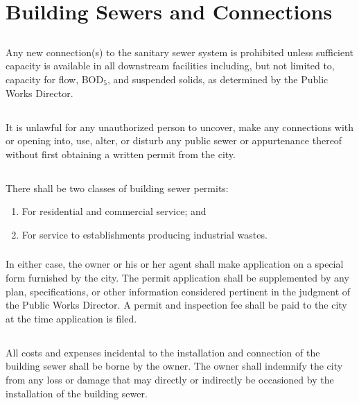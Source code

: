 
\setcounter{section}{14}
\section{Building Sewers and Connections}
\subsection{}
Any new connection(s) to the sanitary sewer system is prohibited unless sufficient capacity is available in all downstream facilities including, but not limited to, capacity for flow, BOD$_{5}$, and suspended solids, as determined by the Public Works Director.
\subsection{}
It is unlawful for any unauthorized person to uncover, make any connections with or opening into, use, alter, or disturb any public sewer or appurtenance thereof without first obtaining a written permit from the city.
\subsection{}
\subsubsection{}
There shall be two classes of building sewer permits:
\begin{enumerate}[{\indent}a)]
    \item For residential and commercial service; and
    \item For service to establishments producing industrial wastes.
\end{enumerate}
\subsubsection{}
In either case, the owner or his or her agent shall make application on a special form furnished by the city.  The permit application shall be supplemented by any plan, specifications, or other information considered pertinent in the judgment of the Public Works Director.  A permit and inspection fee shall be paid to the city at the time application is filed.
\subsection{}
All costs and expenses incidental to the installation and connection of the building sewer shall be borne by the owner.  The owner shall indemnify the city from any loss or damage that may directly or indirectly be occasioned by the installation of the building sewer.
